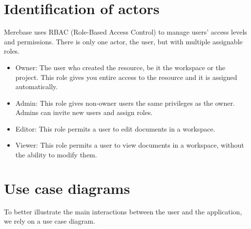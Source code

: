 \section{Identification of actors}

Merebase uses RBAC (Role-Based Access Control) to manage users' access
levels and permissions. There is only one actor, the user, but with
multiple assignable roles.

\begin{itemize}
	\item
	      Owner: The user who created the resource, be it the workspace or the
	      project. This role gives you entire access to the resource and it is
	      assigned automatically.
	\item
	      Admin: This role gives non-owner users the same privileges as the
	      owner. Admins can invite new users and assign roles.
	\item
	      Editor: This role permits a user to edit documents in a workspace.
	\item
	      Viewer: This role permits a user to view documents in a workspace,
	      without the ability to modify them.
\end{itemize}

\section{Use case diagrams}

To better illustrate the main interactions between the user and the
application, we rely on a use case diagram.




